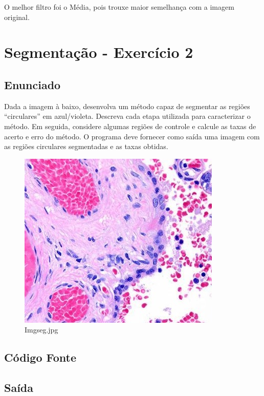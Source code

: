\documentclass[10pt,a4paper]{article}
\begin{document}
O melhor filtro foi o Média, pois trouxe maior semelhança com a imagem original.

\pagebreak

\section{Segmentação - Exercício 2}

\subsection{Enunciado}
Dada a imagem à baixo, desenvolva um método capaz de segmentar as regiões “circulares” em azul/violeta. Descreva cada etapa utilizada para caracterizar o método. Em seguida, considere algumas regiões de controle e calcule as taxas de acerto e erro do método. O programa deve fornecer como saída uma imagem com as regiões circulares segmentadas e as taxas obtidas.

\begin{figure}[H]
    \centering
    \includegraphics[scale=0.8]{images_original/11/Img_seg.jpg}
    \caption{Img\textunderscore seg.jpg}
\end{figure}

\subsection{Código Fonte}



\subsection{Saída}
\end{document}
